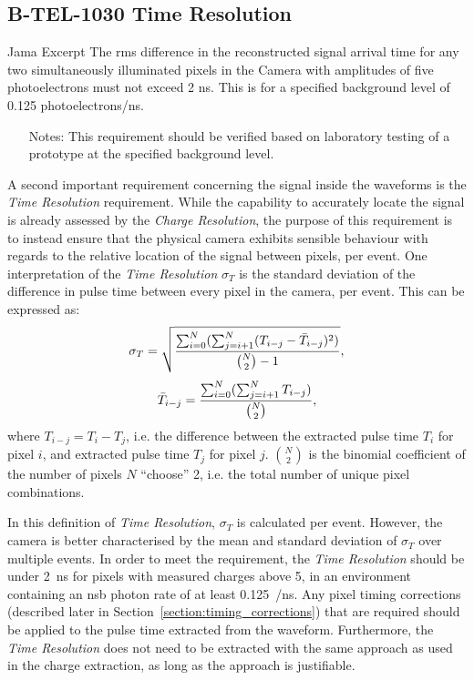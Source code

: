 \subsection{B-TEL-1030 Time Resolution} \label{section:time_res}

\begin{requirement}{Jama Excerpt} 
The rms difference in the reconstructed signal arrival time for any two simultaneously illuminated pixels in the Camera with amplitudes of five photoelectrons must not exceed 2 ns. This is for a specified background level of 0.125 photoelectrons/ns.

\begin{itemize}
\item [Notes:] This requirement should be verified based on laboratory testing of a prototype at the specified background level.
\end{itemize}
\end{requirement}

A second important requirement concerning the signal inside the waveforms is the \textit{Time Resolution} requirement. While the capability to accurately locate the signal is already assessed by the \textit{Charge Resolution}, the purpose of this requirement is to instead ensure that the physical camera exhibits sensible behaviour with regards to the relative location of the signal between pixels, per event. One interpretation of the \textit{Time Resolution} $\sigma_T$ is the standard deviation of the difference in pulse time between every pixel in the camera, per event. This can be expressed as:
\begin{equation} \label{eq:time_res}
\sigma_T = \sqrt{\frac{\sum_{i=0}^N(\sum_{j=i+1}^N (T_{i-j} - \bar{T}_{i-j})^2)}{\binom{N}{2} - 1}},
\end{equation}
\begin{equation} \label{eq:time_res2}
\bar{T}_{i-j} = \frac{\sum_{i=0}^N(\sum_{j=i+1}^N T_{i-j})}{\binom{N}{2}},
\end{equation}
where $T_{i-j} = T_i - T_j$, i.e. the difference between the extracted pulse time $T_i$ for pixel $i$, and extracted pulse time $T_j$ for pixel $j$. $\binom{N}{2}$ is the binomial coefficient of the number of pixels $N$ ``choose'' 2, i.e. the total number of unique pixel combinations.

In this definition of \textit{Time Resolution}, $\sigma_T$ is calculated per event. However, the camera is better characterised by the mean and standard deviation of $\sigma_T$ over multiple events. In order to meet the requirement, the \textit{Time Resolution} should be under \SI{2}{ns} for pixels with measured charges above \SI{5}{\pe}, in an environment containing an \gls{nsb} photon rate of at least \SI{0.125}{\pe/ns}. Any pixel timing corrections (described later in Section~\ref{section:timing_corrections}) that are required should be applied to the pulse time extracted from the waveform. Furthermore, the \textit{Time Resolution} does not need to be extracted with the same approach as used in the charge extraction, as long as the approach is justifiable.

